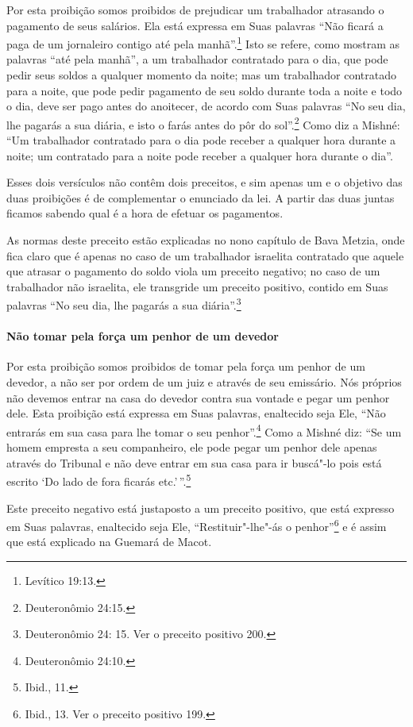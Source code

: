 \begin{multicols}{2}
Por esta proibição somos proibidos de prejudicar um trabalhador
atrasando o pagamento de seus salários. Ela está expressa em Suas
palavras ``Não ficará a paga de um jornaleiro contigo até pela manhã''.\footnote{Levítico 19:13.} Isto se refere, como mostram as palavras ``até pela
manhã'', a um trabalhador contratado para o dia, que pode pedir seus
soldos a qualquer momento da noite; mas um trabalhador contratado para a
noite, que pode pedir pagamento de seu soldo durante toda a noite e todo
o dia, deve ser pago antes do anoitecer, de acordo com Suas palavras
``No seu dia, lhe pagarás a sua diária, e isto o farás antes do pôr do
sol''.\footnote{Deuteronômio 24:15.} Como diz a Mishné: ``Um trabalhador
contratado para o dia pode receber a qualquer hora durante a noite; um
contratado para a noite pode receber a qualquer hora durante o dia''.

Esses dois versículos não contêm dois preceitos, e sim apenas um e o
objetivo das duas proibições é de complementar o enunciado da lei. A
partir das duas juntas ficamos sabendo qual é a hora de efetuar os
pagamentos.

As normas deste preceito estão explicadas no nono capítulo de Bava
Metzia\starr, onde fica claro que é apenas no caso de um trabalhador israelita
contratado que aquele que atrasar o pagamento do soldo viola um
preceito negativo; no caso de um trabalhador não israelita, ele
transgride um preceito positivo, contido em Suas palavras ``No seu dia,
lhe pagarás a sua diária''.\footnote{Deuteronômio 24: 15. Ver o preceito positivo 200.}

\paragraph{Não tomar pela força um penhor de um devedor}

Por esta proibição somos proibidos de tomar pela força um penhor de um
devedor, a não ser por ordem de um juiz e através de seu emissário. Nós
próprios não devemos entrar na casa do devedor contra sua vontade e
pegar um penhor dele. Esta proibição está expressa em Suas palavras,
enaltecido seja Ele, ``Não entrarás em sua casa para lhe tomar o seu
penhor''.\footnote{Deuteronômio 24:10.} Como a Mishné diz: ``Se um homem
empresta a seu companheiro, ele pode pegar um penhor dele apenas através
do Tribunal e não deve entrar em sua casa para ir buscá"-lo pois está
escrito `Do lado de fora ficarás etc.'\,''.\footnote{Ibid., 11.}

Este preceito negativo está justaposto a um preceito positivo, que está
expresso em Suas palavras, enaltecido seja Ele, ``Restituir"-lhe"-ás o
penhor''\footnote{Ibid., 13. Ver o preceito positivo 199.} e é assim que está explicado
na Guemará\starr{} de Macot\starr.


\end{multicols}
